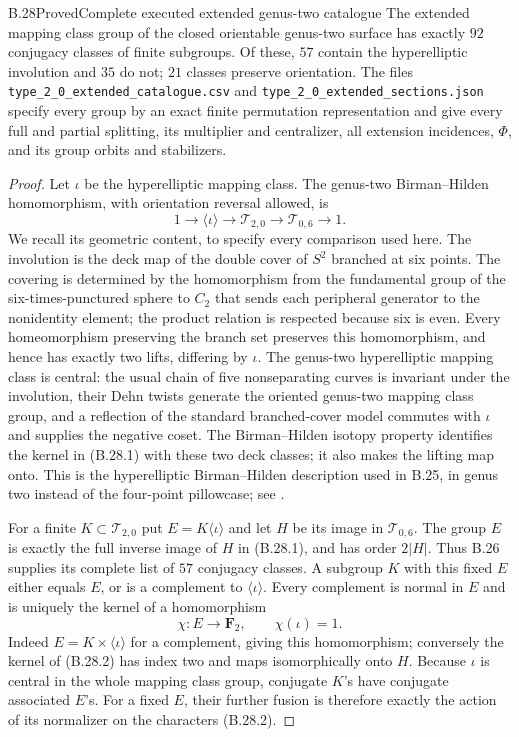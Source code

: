 \begin{claim}{B.28}{Proved}{Complete executed extended genus-two catalogue}
The extended mapping class group of the closed orientable genus-two
surface has exactly $92$ conjugacy classes of finite subgroups.  Of
these, $57$ contain the hyperelliptic involution and $35$ do not;
$21$ classes preserve orientation.  The files
\texttt{type\_2\_0\_extended\_catalogue.csv} and
\texttt{type\_2\_0\_extended\_sections.json} specify every group by
an exact finite permutation representation and give every full and
partial splitting, its multiplier and centralizer, all extension
incidences, $\Phi$, and its group orbits and stabilizers.
\end{claim}
\begin{proof}
Let $\iota$ be the hyperelliptic mapping class.  The genus-two
Birman--Hilden homomorphism, with orientation reversal allowed, is
\[
 1\longrightarrow\langle\iota\rangle
 \longrightarrow\mathcal T_{2,0}
 \longrightarrow\mathcal T_{0,6}\longrightarrow1.       \tag{B.28.1}
\]
We recall its geometric content, to specify every comparison used here.
The involution is the deck map of the double cover of $S^2$ branched
at six points.  The covering is determined by the homomorphism from
the fundamental group of the six-times-punctured sphere to $C_2$
that sends each peripheral generator to the nonidentity element;
the product relation is respected because six is even.  Every
homeomorphism preserving the branch set preserves this homomorphism,
and hence has exactly two lifts, differing by $\iota$.
The genus-two hyperelliptic mapping class is central: the usual chain
of five nonseparating curves is invariant under the involution, their
Dehn twists generate the oriented genus-two mapping class group,
and a reflection of the standard branched-cover model commutes with
$\iota$ and supplies the negative coset.  The Birman--Hilden isotopy
property identifies the kernel in (B.28.1) with these two deck classes;
it also makes the lifting map onto.  This is the hyperelliptic
Birman--Hilden description used in B.25, in genus two instead of the
four-point pillowcase; see \cite[\S9.4.2, p.~257, with the proof in \S9.4.3]{bFarbMargalit2012}.

For a finite $K\subset\mathcal T_{2,0}$ put
$E=K\langle\iota\rangle$ and let $H$ be its image in
$\mathcal T_{0,6}$.  The group $E$ is exactly the full inverse image
of $H$ in (B.28.1), and has order $2|H|$.  Thus B.26 supplies its
complete list of $57$ conjugacy classes.  A subgroup $K$ with this
fixed $E$ either equals $E$, or is a complement to
$\langle\iota\rangle$.  Every complement is normal in $E$ and is
uniquely the kernel of a homomorphism
\[
             \chi:E\longrightarrow\mathbf F_2,
             \qquad\chi(\iota)=1.                     \tag{B.28.2}
\]
Indeed $E=K\times\langle\iota\rangle$ for a complement, giving
this homomorphism; conversely the kernel of (B.28.2) has index two
and maps isomorphically onto $H$.  Because $\iota$ is central in the
whole mapping class group, conjugate $K$'s have conjugate associated
$E$'s.  For a fixed $E$, their further fusion is therefore exactly
the action of its normalizer on the characters (B.28.2).


\end{proof}
